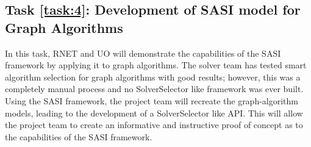 \label{task:4}
\subsection{Task \ref{task:4}: Development of SASI model for Graph Algorithms }

In this task, RNET and UO will demonstrate the capabilities of the SASI framework by applying 
it to graph algorithms. The solver team has tested smart algorithm selection for graph algorithms 
with good results; however, this was a completely manual process and no SolverSelector like framework was ever built. Using 
the SASI framework, the project team will recreate the graph-algorithm models, leading to the development of a SolverSelector
like API. This will allow the project team to create an informative and instructive proof of concept as to the capabilities 
of the SASI framework. 
